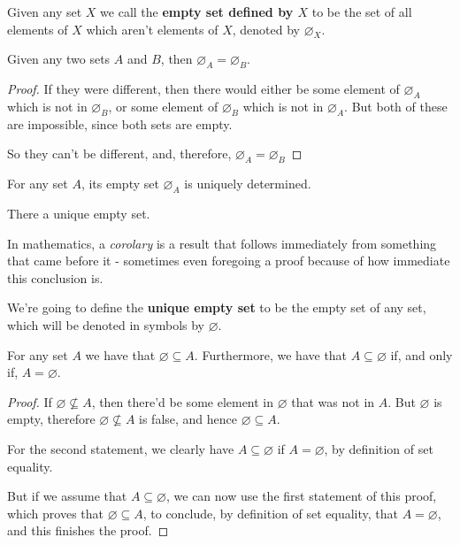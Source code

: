 \begin{df}
	Given any set $X$ we call the \textbf{empty set defined by $X$} to be the set of all elements of $X$ which aren't elements of $X$, denoted by $\varnothing_X$.
\end{df}

\begin{theorem}
	Given any two sets $A$ and $B$, then $\varnothing_A=\varnothing_B$.
\end{theorem}
\begin{proof}
	If they were different, then there would either be some element of $\varnothing_A$ which is not in $\varnothing_B$, or some element of $\varnothing_B$ which is not in $\varnothing_A$. But both of these are impossible, since both sets are empty.
	
	So they can't be different, and, therefore, $\varnothing_A=\varnothing_B$
\end{proof}
\begin{cor}
	For any set $A$, its empty set $\varnothing_A$ is uniquely determined.
\end{cor}
\begin{cor}
	There a unique empty set.
\end{cor}

\begin{rmk}
	In mathematics, a \emph{corolary} is a result that follows immediately from something that came before it - sometimes even foregoing a proof because of how immediate this conclusion is.
\end{rmk}

\begin{df}
	We're going to define the \textbf{unique empty set} to be the empty set of any set, which will be denoted in symbols by $\varnothing$.
\end{df}

\begin{prop}
	For any set $A$ we have that $\varnothing\subseteq A$. Furthermore, we have that $A\subseteq\varnothing$ if, and only if, $A=\varnothing$.
\end{prop}
\begin{proof}
	If $\varnothing\not\subseteq A$, then there'd be some element in $\varnothing$ that was not in $A$. But $\varnothing$ is empty, therefore $\varnothing\not\subseteq A$ is false, and hence $\varnothing \subseteq A$.
	
	\bigskip
	For the second statement, we clearly have $A\subseteq \varnothing$ if $A=\varnothing$, by definition of set equality.
	
	But if we assume that $A\subseteq\varnothing$, we can now use the first statement of this proof, which proves that $\varnothing\subseteq A$, to conclude, by definition of set equality, that $A=\varnothing$, and this finishes the proof.
\end{proof}
\pagebreak
